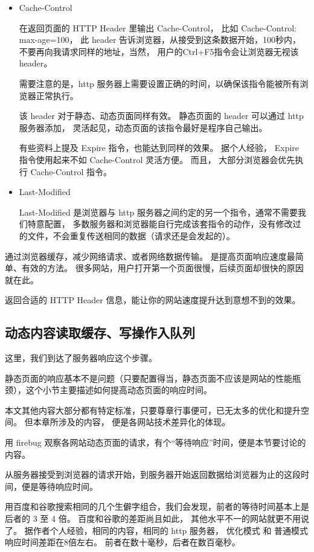 \documentclass{article}
\begin{document}
  \begin{itemize}
  \item Cache-Control

    在返回页面的 HTTP Header 里输出 Cache-Control， 比如 Cache-Control: max-age=100，
    此 header 告诉浏览器，从接受到这条数据开始，100秒内，不要再向我请求同样的地址，当然，
    用户的Ctrl+F5指令会让浏览器无视该header。

    需要注意的是，http 服务器上需要设置正确的时间，以确保该指令能被所有浏览器正常执行。

    该 header 对于静态、动态页面同样有效。 静态页面的 header 可以通过 http 服务器添加，
    灵活起见，动态页面的该指令最好是程序自己输出。

    有些资料上提及 Expire 指令，也能达到同样的效果。 据个人经验， Expire 指令使用起来不如 Cache-Control
    灵活方便。 而且， 大部分浏览器会优先执行 Cache-Control 指令。

  \item Last-Modified

    Last-Modified 是浏览器与 http 服务器之间约定的另一个指令，通常不需要我们特意配置，
    多数服务器和浏览器能自行完成该套指令的动作，没有修改过的文件，不会重复传送相同的数据（请求还是会发起的）。
  \end{itemize}

  通过浏览器缓存，减少网络请求、或者网络数据传输。 是提高页面响应速度最简单、有效的方法。
  很多网站，用户打开第一个页面很慢，后续页面却很快的原因就在此。

  返回合适的 HTTP Header 信息，能让你的网站速度提升达到意想不到的效果。
  
  \subsection{动态内容读取缓存、写操作入队列}

  这里，我们到达了服务器响应这个步骤。

  静态页面的响应基本不是问题（只要配置得当，静态页面不应该是网站的性能瓶颈），这个小节主要描述如何提高动态页面的响应时间。

  本文其他内容大部分都有特定标准，只要尊章行事便可，已无太多的优化和提升空间。 但本章所涉及的内容，
  便是各网站技术差异化的体现。

  用 firebug 观察各网站动态页面的请求，有个“等待响应”时间，便是本节要讨论的内容。

  从服务器接受到浏览器的请求开始，到服务器开始返回数据给浏览器为止的这段时间，便是等待响应时间。

  用百度和谷歌搜索相同的几个生僻字组合，我们会发现，前者的等待时间基本上是后者的 3 至 4 倍。 百度和谷歌的差距尚且如此，
  其他水平不一的网站就更不用说了。 据作者个人经验，相同的内容，相同的 http 服务器，
  优化模式 和 普通模式 响应时间差距在8倍左右。
  前者在数十毫秒，后者在数百毫秒。
\end{document}
